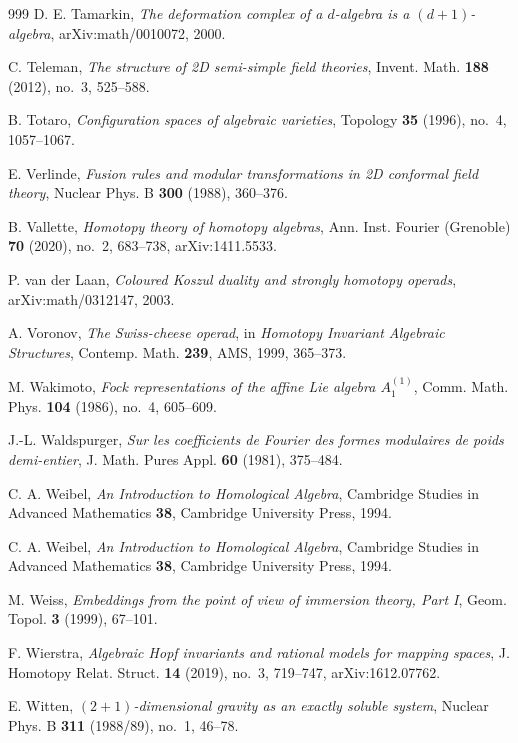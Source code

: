\begin{thebibliography}{999}
D. E. Tamarkin, \emph{The deformation complex of a $d$-algebra is a $(d+1)$-algebra}, arXiv:math/0010072, 2000.

C. Teleman, \emph{The structure of 2D semi-simple field theories}, Invent. Math. \textbf{188} (2012), no.~3, 525--588.

B. Totaro, \emph{Configuration spaces of algebraic varieties}, Topology \textbf{35} (1996), no.~4, 1057--1067.

E. Verlinde, \emph{Fusion rules and modular transformations in 2D conformal field theory}, Nuclear Phys. B \textbf{300} (1988), 360--376.

B. Vallette, \emph{Homotopy theory of homotopy algebras}, Ann. Inst. Fourier (Grenoble) \textbf{70} (2020), no.~2, 683--738, arXiv:1411.5533.

P. van der Laan, \emph{Coloured Koszul duality and strongly homotopy operads}, arXiv:math/0312147, 2003.

A. Voronov, \emph{The Swiss-cheese operad}, in \emph{Homotopy Invariant Algebraic Structures}, Contemp. Math. \textbf{239}, AMS, 1999, 365--373.

M. Wakimoto, \emph{Fock representations of the affine Lie algebra $A_1^{(1)}$}, Comm. Math. Phys. \textbf{104} (1986), no.~4, 605--609.

J.-L. Waldspurger, \emph{Sur les coefficients de Fourier des formes modulaires de poids demi-entier}, J. Math. Pures Appl. \textbf{60} (1981), 375--484.

C. A. Weibel, \emph{An Introduction to Homological Algebra}, Cambridge Studies in Advanced Mathematics \textbf{38}, Cambridge University Press, 1994.

C. A. Weibel, \emph{An Introduction to Homological Algebra}, Cambridge Studies in Advanced Mathematics \textbf{38}, Cambridge University Press, 1994.

M. Weiss, \emph{Embeddings from the point of view of immersion theory, Part I}, Geom. Topol. \textbf{3} (1999), 67--101.

F. Wierstra, \emph{Algebraic Hopf invariants and rational models for mapping spaces}, J. Homotopy Relat. Struct. \textbf{14} (2019), no.~3, 719--747, arXiv:1612.07762.

E. Witten, \emph{$(2+1)$-dimensional gravity as an exactly soluble system}, Nuclear Phys. B \textbf{311} (1988/89), no.~1, 46--78.


\end{thebibliography}
